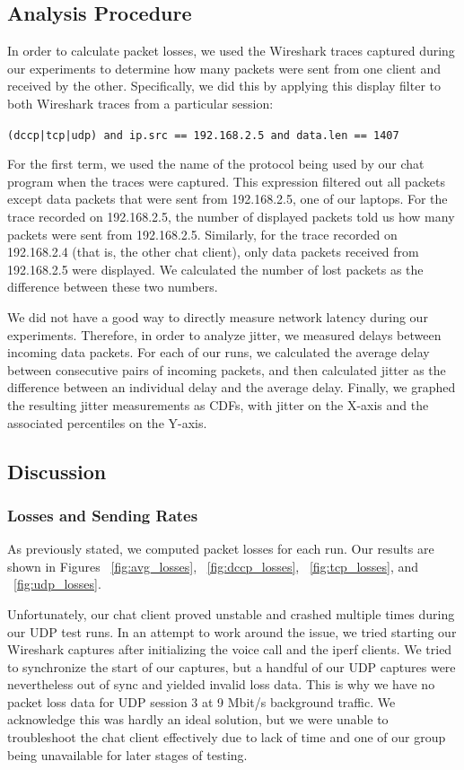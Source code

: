 \subsection{Analysis Procedure}

In order to calculate packet losses, we used the Wireshark traces captured
during our experiments to determine how many packets were sent from one client
and received by the other. Specifically, we did this by applying this display
filter to both Wireshark traces from a particular session:

\texttt{(dccp|tcp|udp) and ip.src == 192.168.2.5 and data.len == 1407}

For the first term, we used the name of the protocol being used by our chat
program when the traces were captured. This expression filtered out all packets except data packets that were sent from
192.168.2.5, one of our laptops. For the trace recorded on 192.168.2.5, the
number of displayed packets told us how many packets were sent from 192.168.2.5.
Similarly, for the trace recorded on 192.168.2.4 (that is, the other chat
client), only data packets received from 192.168.2.5 were displayed. We
calculated the number of lost packets as the difference between these two
numbers.

We did not have a good way to directly measure network latency during our
experiments. Therefore, in order to analyze jitter, we measured delays between
incoming data packets. For each of our runs, we calculated the average delay
between consecutive pairs of incoming packets, and then calculated jitter as the
difference between an individual delay and the average delay. Finally, we
graphed the resulting jitter measurements as CDFs, with jitter on the X-axis and
the associated percentiles on the Y-axis.

\subsection{Discussion}

\subsubsection{Losses and Sending Rates}

As previously stated, we computed packet losses for each run. Our results are
shown in Figures ~\ref{fig:avg_losses}, ~\ref{fig:dccp_losses},
~\ref{fig:tcp_losses}, and ~\ref{fig:udp_losses}.

Unfortunately, our chat client proved unstable and crashed multiple times during
our UDP test runs. In an attempt to work around the issue, we tried starting our
Wireshark captures after initializing the voice call and the iperf clients. We
tried to synchronize the start of our captures, but a handful of our UDP
captures were nevertheless out of sync and yielded invalid loss data. This is
why we have no packet loss data for UDP session 3 at 9 Mbit/s background
traffic. We acknowledge this was hardly an ideal solution, but we were unable to
troubleshoot the chat client effectively due to lack of time and one of our
group being unavailable for later stages of testing.

